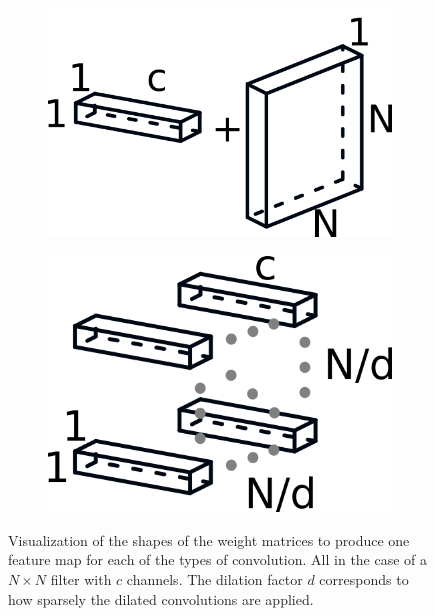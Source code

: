 \documentclass{kththesis}
\begin{document}
\begin{figure}[h]
      \begin{subfigure}[b]{0.45\textwidth}
        \includegraphics[width=\textwidth]{separable}
    \end{subfigure}
    \qquad %
    \begin{subfigure}[b]{0.4\textwidth}
        \includegraphics[width=\textwidth]{dilated}
      \end{subfigure}
      \caption{Visualization of the shapes of the weight matrices to produce one
        feature map for each of the types of convolution. All in the case of a \(N \times N\) filter with \(c\) channels. The dilation factor \(d\) corresponds to how
        sparsely the dilated convolutions are applied.}\label{fig:Convs}
\end{figure}
\end{document}
